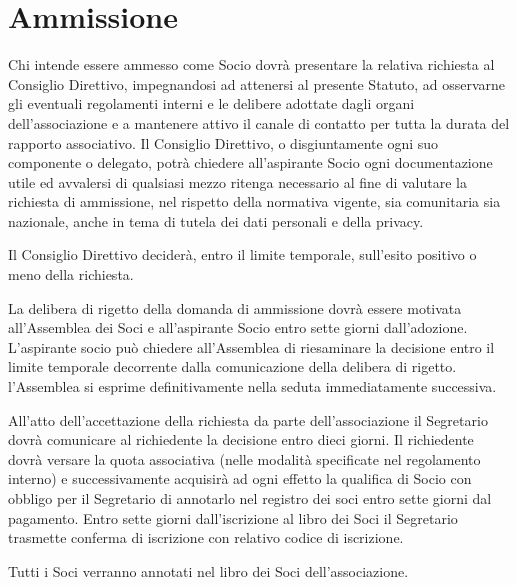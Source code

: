 \documentclass[legalpaper, 11pt]{exam}
\let\tempone\enumerate
\let\temptwo\endenumerate
\renewenvironment{enumerate}{\tempone\addtolength{\itemsep}{-0.45\baselineskip}}{\temptwo}
\begin{document}
{\section{Ammissione}
\begin{enumerate}
 \item Chi intende essere ammesso come Socio dovrà presentare la relativa richiesta al Consiglio Direttivo, impegnandosi ad attenersi al presente Statuto, ad osservarne gli eventuali regolamenti interni e le delibere adottate dagli organi dell’associazione e a mantenere attivo il canale di contatto per tutta la durata del rapporto associativo. Il Consiglio Direttivo, o disgiuntamente ogni suo componente o delegato, potrà chiedere all’aspirante Socio ogni documentazione utile ed avvalersi di qualsiasi mezzo ritenga necessario al fine di valutare la richiesta di ammissione, nel rispetto della normativa vigente, sia comunitaria sia nazionale, anche in tema di tutela dei dati personali e della privacy.
 \item Il Consiglio Direttivo deciderà, entro il limite temporale, sull’esito positivo o meno della richiesta.
 \item La delibera di rigetto della domanda di ammissione dovrà essere motivata all’Assemblea dei Soci e all’aspirante Socio entro sette giorni dall’adozione. L’aspirante socio può chiedere all’Assemblea di riesaminare la decisione entro il limite temporale decorrente dalla comunicazione della delibera di rigetto. l’Assemblea si esprime definitivamente nella seduta immediatamente successiva.
 \item All’atto dell’accettazione della richiesta da parte dell’associazione il Segretario dovrà comunicare al richiedente la decisione entro dieci giorni. Il richiedente dovrà versare la quota associativa (nelle modalità specificate nel regolamento interno) e successivamente acquisirà ad ogni effetto la qualifica di Socio con obbligo per il Segretario di annotarlo nel registro dei soci entro sette giorni dal pagamento. Entro sette giorni dall’iscrizione al libro dei Soci il Segretario trasmette conferma di iscrizione con relativo codice di iscrizione.
 \item Tutti i Soci verranno annotati nel libro dei Soci dell’associazione.
\end{enumerate}

}
\end{document}
